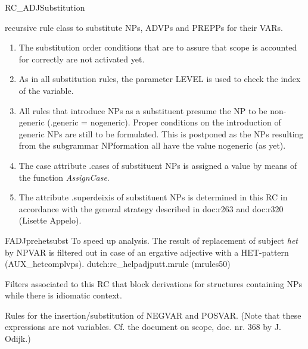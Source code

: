 \begin{mruleclass}{RC\_ADJSubstitution}
\begin{classdescr}
\kind recursive rule class
\classtask to substitute NPs, ADVPs and PREPPs for their VARs.
\classremarks\mbox{}
\begin{enumerate}
  \item 
The substitution order conditions that are to 
assure that scope is accounted for 
correctly are not activated yet.
  \item
As in all substitution rules, the parameter LEVEL is used to check 
the index of the variable. 
\item
All rules that introduce NPs as a substituent presume the NP to be non-
generic (.generic = nogeneric). 
Proper conditions on the introduction of generic NPs are still to be formulated.
This is postponed as the NPs resulting from the subgrammar NPformation all have 
the value nogeneric (as yet). 
\item
The case attribute .cases of substituent NPs 
is assigned a value by means of the function {\em AssignCase}.
\item
The  attribute .superdeixis of substituent NPs is determined in this RC
in accordance with the general strategy described in doc:r263 and doc:r320
  (Lisette Appelo).


\end{enumerate}

\nofilters

\begin{speedrules}
\begin{member}
 FADJprehetsubst
 To speed up analysis. The result of
replacement of subject {\em het} by NPVAR is filtered out in case 
of an ergative 
adjective with a HET-pattern (AUX\_hetcomplvps).
\file dutch:rc\_helpadjputt.mrule (mrules50)
\end{member}
\end{speedrules}

\begin{plannedrules}
\item Filters associated to this RC that block derivations 
for structures containing NPs while there is idiomatic context.
\item Rules for the insertion/substitution of NEGVAR and POSVAR.
(Note that these expressions are not variables. 
Cf. the document on scope, doc. nr. 368  by J. Odijk.)
\end{plannedrules}

\norulesnotince


\end{classdescr}
\end{mruleclass}
